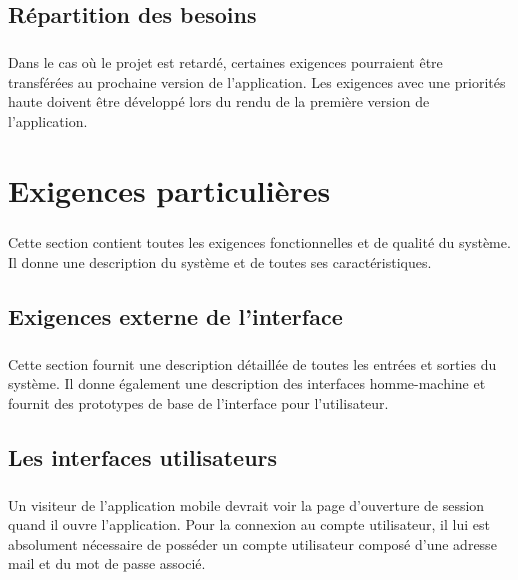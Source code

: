 \documentclass[titlepage, 12pt]{report}
\begin{document}
\section{Répartition des besoins}

\paragraph{}Dans le cas où le projet est retardé, certaines exigences pourraient être transférées au prochaine version de l'application. Les exigences avec une priorités haute doivent être développé lors du rendu de la première version de l'application.

\chapter{Exigences particulières}

\paragraph{}Cette section contient toutes les exigences fonctionnelles et de qualité du système. Il donne une description du système et de toutes ses caractéristiques.

\section{Exigences externe de l'interface}

\paragraph{}Cette section fournit une description détaillée de toutes les entrées et sorties du système. Il donne également une description des interfaces homme-machine et fournit des prototypes de base de l'interface pour l'utilisateur.

\section{Les interfaces utilisateurs}

\paragraph{}Un visiteur de l'application mobile devrait voir la page d'ouverture de session quand il ouvre l'application. Pour la connexion au compte utilisateur, il lui est absolument nécessaire de posséder un compte utilisateur composé d'une adresse mail et du mot de passe associé.
\end{document}
